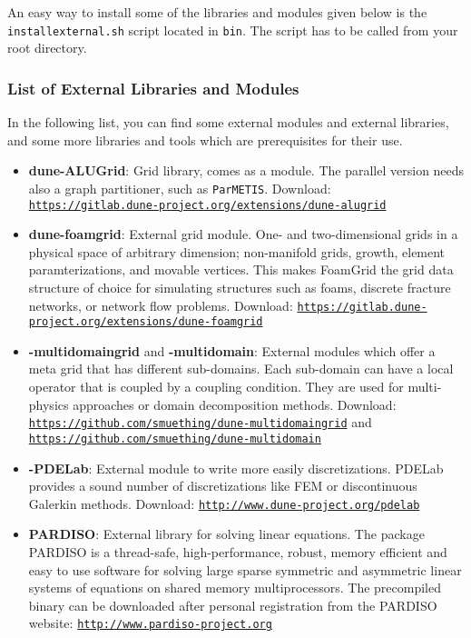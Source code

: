 An easy way to install some of the libraries and modules given below is the
\texttt{installexternal.sh} script located in \texttt{bin}. The script
has to be called from your {\Dune} root directory.


\subsubsection{List of External Libraries and Modules}
In the following list, you can find some external modules and external libraries,
and some more libraries and tools which are prerequisites for their use.

\begin{itemize}
\item \textbf{dune-ALUGrid}: Grid library, comes as a \Dune module.
  The parallel version needs also a graph partitioner, such as \texttt{ParMETIS}.
  Download: \texttt{\url{https://gitlab.dune-project.org/extensions/dune-alugrid}}

\item \textbf{dune-foamgrid}: External grid module. One- and two-dimensional grids
  in a physical space of arbitrary dimension; non-manifold grids, growth, element
  paramterizations, and movable vertices. This makes FoamGrid the grid data structure
  of choice for simulating structures such as foams, discrete fracture networks,
  or network flow problems.
  Download: \texttt{\url{https://gitlab.dune-project.org/extensions/dune-foamgrid}}

\item \textbf{\Dune-multidomaingrid} and \textbf{\Dune-multidomain}: External modules which offer a meta grid that
  has different sub-domains. Each sub-domain can have a local operator that is coupled by a coupling condition. They are
  used for multi-physics approaches or domain decomposition methods. Download:
  \texttt{\url{https://github.com/smuething/dune-multidomaingrid}}
  and \texttt{\url{https://github.com/smuething/dune-multidomain}}

\item \textbf{\Dune-PDELab}: External module to write more easily discretizations. PDELab provides
  a sound number of discretizations like FEM or discontinuous Galerkin methods.
  Download: \texttt{\url{http://www.dune-project.org/pdelab}}

\item \textbf{PARDISO}: External library for solving linear equations. The package PARDISO is a thread-safe,
  high-performance, robust, memory efficient and easy to use software for solving large sparse symmetric
  and asymmetric linear systems of equations on shared memory multiprocessors. The precompiled binary
  can be downloaded after personal registration from the PARDISO website: \texttt{\url{http://www.pardiso-project.org}}


\end{itemize}

